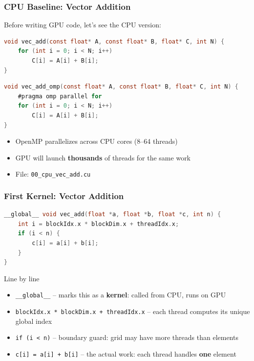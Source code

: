 \documentclass[aspectratio=169]{beamer}
\begin{document}
\begin{frame}[fragile]
	\frametitle{CPU Baseline: Vector Addition}
	Before writing GPU code, let's see the CPU version:
	\begin{lstlisting}[language=C, title={\color{codegreen}Sequential}]
void vec_add(const float* A, const float* B, float* C, int N) {
    for (int i = 0; i < N; i++)
        C[i] = A[i] + B[i];
}
	\end{lstlisting}
	\vspace{0.2em}
	\begin{lstlisting}[language=C, title={\color{codegreen}Parallel with OpenMP}]
void vec_add_omp(const float* A, const float* B, float* C, int N) {
    #pragma omp parallel for
    for (int i = 0; i < N; i++)
        C[i] = A[i] + B[i];
}
	\end{lstlisting}
	\vspace{0.3em}
	\begin{itemize}
		\item OpenMP parallelizes across CPU cores (8--64 threads)
		\item GPU will launch \textbf{thousands} of threads for the same work
		\item File: \texttt{00\_cpu\_vec\_add.cu}
	\end{itemize}
\end{frame}

\begin{frame}[fragile]
	\frametitle{First Kernel: Vector Addition}
	\begin{lstlisting}[language=C, title={\color{codegreen}Kernel -- runs on GPU, one instance per thread}]
__global__ void vec_add(float *a, float *b, float *c, int n) {
    int i = blockIdx.x * blockDim.x + threadIdx.x;
    if (i < n) {
        c[i] = a[i] + b[i];
    }
}
	\end{lstlisting}
	\vspace{0.5em}
	\begin{block}{Line by line}
		\begin{itemize}
			\item \texttt{\_\_global\_\_} -- marks this as a \textbf{kernel}: called from CPU, runs on GPU
			\item \texttt{blockIdx.x * blockDim.x + threadIdx.x} -- each thread computes its unique global index
			\item \texttt{if (i < n)} -- boundary guard: grid may have more threads than elements
			\item \texttt{c[i] = a[i] + b[i]} -- the actual work: each thread handles \textbf{one} element
		\end{itemize}
	\end{block}
\end{frame}
\end{document}

